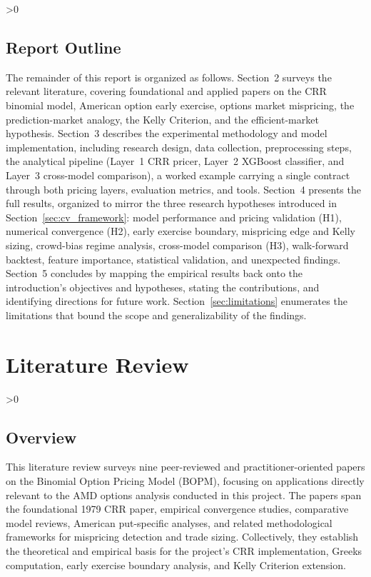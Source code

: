\documentclass[12pt, letterpaper]{article}
\let\oldsection\section
\renewcommand{\section}{\clearpage\oldsection}
\let\oldsubsection\subsection
\renewcommand{\subsection}{%
  \ifnum\value{subsection}>0 \clearpage\fi
  \oldsubsection
}
\begin{document}
\subsection{Report Outline}

The remainder of this report is organized as follows. Section~2
surveys the relevant literature, covering foundational and applied
papers on the CRR binomial model, American option early exercise,
options market mispricing, the prediction-market analogy, the
Kelly Criterion, and the efficient-market hypothesis. Section~3
describes the experimental methodology and model implementation,
including research design, data collection, preprocessing steps, the
analytical pipeline (Layer~1 CRR pricer, Layer~2 XGBoost classifier,
and Layer~3 cross-model comparison), a worked example carrying a
single contract through both pricing layers, evaluation metrics, and
tools. Section~4 presents the full results, organized to mirror the
three research hypotheses introduced in
Section~\ref{sec:cv_framework}: model performance and pricing
validation (H1), numerical convergence (H2), early exercise
boundary, mispricing edge and Kelly sizing, crowd-bias regime
analysis, cross-model comparison (H3), walk-forward backtest, feature
importance, statistical validation, and unexpected findings.
Section~5 concludes by mapping the empirical results back onto the
introduction's objectives and hypotheses, stating the contributions,
and identifying directions for future work. Section~\ref{sec:limitations}
enumerates the limitations that bound the scope and generalizability
of the findings.


\newpage
\section{Literature Review}

\subsection{Overview}

This literature review surveys nine peer-reviewed and
practitioner-oriented papers on the Binomial Option Pricing Model
(BOPM), focusing on applications directly relevant to the AMD options
analysis conducted in this project. The papers span the foundational
1979 CRR paper, empirical convergence studies, comparative model
reviews, American put-specific analyses, and related methodological
frameworks for mispricing detection and trade sizing. Collectively,
they establish the theoretical and empirical basis for the project's
CRR implementation, Greeks computation, early exercise boundary
analysis, and Kelly Criterion extension.
\end{document}
